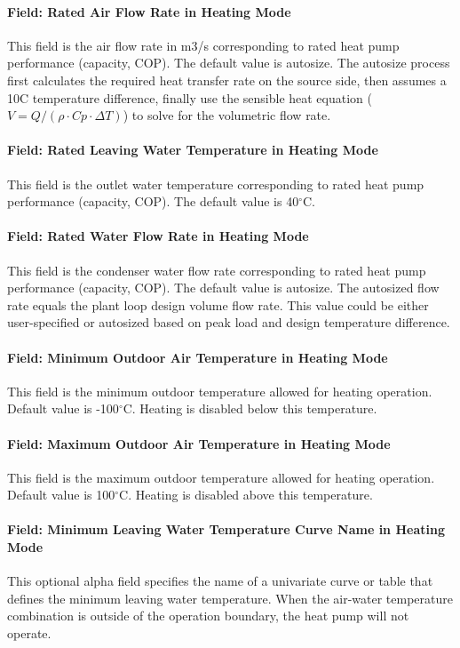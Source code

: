 \paragraph{Field: Rated Air Flow Rate in Heating Mode} This field is the air
flow rate in m3/s corresponding to rated heat pump performance (capacity, COP).
The default value is autosize.
The autosize process first calculates the required heat transfer rate on the source
side, then assumes a 10C temperature difference, finally use the sensible heat
equation ($V = Q / (\rho \cdot Cp \cdot \Delta T)$) to solve for the volumetric flow rate.
\paragraph{Field: Rated Leaving Water Temperature in Heating Mode} This field is
the outlet water temperature corresponding to rated heat pump performance
(capacity, COP). The default value is 40$^\circ$C.
\paragraph{Field: Rated Water Flow Rate in Heating Mode} This field is the
condenser water flow rate corresponding to rated heat pump performance
(capacity, COP). The default value is autosize.
The autosized flow rate equals the plant loop design volume flow rate.
This value could be either user-specified or autosized based on peak load and design
temperature difference.
\paragraph{Field: Minimum Outdoor Air Temperature in Heating Mode} This field is
the minimum outdoor temperature allowed for heating operation. Default value is
-100$^\circ$C. Heating is disabled below this temperature.
\paragraph{Field: Maximum Outdoor Air Temperature in Heating Mode} This field is
the maximum outdoor temperature allowed for heating operation. Default value is
100$^\circ$C. Heating is disabled above this temperature.
\paragraph{Field: Minimum Leaving Water Temperature Curve Name in Heating Mode}
This optional alpha field specifies the name of a univariate curve or table that defines
the minimum leaving water temperature. When the air-water temperature combination is outside of
the operation boundary, the heat pump will not operate.
